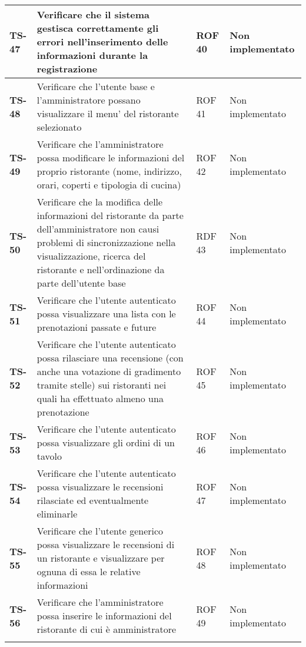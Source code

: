 \begin{longtable}{|>{\centering\arraybackslash}p{1.5cm}|p{9.8cm}|p{2cm}|p{3.5cm}|}
    \hline
    \rowcolor{gray!10}
    \textbf{TS-47} & Verificare che il sistema gestisca correttamente gli errori nell'inserimento delle informazioni durante la registrazione & ROF 40 & Non implementato \\ 
    \hline
    \rowcolor{gray!10}
    \textbf{TS-48} & Verificare che l'utente base e l'amministratore possano visualizzare il menu' del ristorante selezionato & ROF 41 & Non implementato \\ 
    \hline
    \rowcolor{gray!10}
    \textbf{TS-49} & Verificare che l'amministratore possa modificare le informazioni del proprio ristorante (nome, indirizzo, orari, coperti e tipologia di cucina) & ROF 42 & Non implementato \\
    \hline
    \rowcolor{gray!10}
    \textbf{TS-50} & Verificare che la modifica delle informazioni del ristorante da parte dell'amministratore non causi problemi di sincronizzazione nella visualizzazione, ricerca del ristorante e nell'ordinazione da parte dell'utente base & RDF 43 & Non implementato \\ 
    \hline
    \rowcolor{gray!10}
    \textbf{TS-51} & Verificare che l'utente autenticato possa visualizzare una lista con le prenotazioni passate e future & ROF 44 & Non implementato \\ 
    \hline
    \rowcolor{gray!10}
    \textbf{TS-52} & Verificare che l'utente autenticato possa rilasciare una recensione (con anche una votazione di gradimento tramite stelle) sui ristoranti nei quali ha effettuato almeno una prenotazione & ROF 45 & Non implementato \\ 
    \hline
    \rowcolor{gray!10}
    \textbf{TS-53} & Verificare che l'utente autenticato possa visualizzare gli ordini di un tavolo & ROF 46 & Non implementato \\ 
    \hline
    \rowcolor{gray!10}
    \textbf{TS-54} & Verificare che l'utente autenticato possa visualizzare le recensioni rilasciate ed eventualmente eliminarle & ROF 47 & Non implementato \\ 
    \hline
    \rowcolor{gray!10}
    \textbf{TS-55} & Verificare che l'utente generico possa visualizzare le recensioni di un ristorante e visualizzare per ognuna di essa le relative informazioni & ROF 48 & Non implementato \\ 
    \hline
    \rowcolor{gray!10}
    \textbf{TS-56} & Verificare che l'amministratore possa inserire le informazioni del ristorante di cui è amministratore & ROF 49 & Non implementato \\
    \hline
    \rowcolor{gray!10}

\end{longtable}
